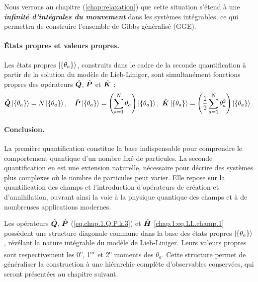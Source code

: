 \begin{mdframed}[
	linewidth=0.5pt, 
	backgroundcolor=gray!5, 
	roundcorner=50pt,	
	innerleftmargin=5pt,
    innerrightmargin=5pt,
    innertopmargin=5pt,
    innerbottommargin=2pt,
    leftmargin=2pt,
    rightmargin=2pt
	]
	Nous verrons au chapitre (\ref{chap:relaxation}) que cette situation s’étend à une {\bf \em infinité d’intégrales du mouvement} dans les systèmes intégrables, ce qui permettra de construire l’ensemble de Gibbs généralisé (GGE).
\end{mdframed}

\paragraph{États propres et valeurs propres.}
Les états propres $\ket{\{\theta_a\}}$, construits dans le cadre de la seconde quantification à partir de la solution du modèle de Lieb-Liniger, sont simultanément fonctions propres des opérateurs $\hat{\bm{Q}}$, $\hat{\bm{P}}$ et $\hat{\bm{K}}$ :
\begin{eqnarray}\label{chap1:eq.Q.P.K.theta.1}
\hat{\bm{Q}} \ket{\{\theta_a\}} = N \ket{\{\theta_a\}}, \quad
\hat{\bm{P}} \ket{\{\theta_a\}} = \left( \sum_{a=1}^N \theta_a \right) \ket{\{\theta_a\}}, \
\hat{\bm{K}} \ket{\{\theta_a\}} = \left( \frac{1}{2} \sum_{a=1}^N \theta_a^2 \right) \ket{\{\theta_a\}}.
\end{eqnarray}

\paragraph*{Conclusion.}

La première quantification constitue la base indispensable pour comprendre le comportement quantique d’un nombre fixé de particules. La seconde quantification en est une extension naturelle, nécessaire pour décrire des systèmes plus complexes où le nombre de particules peut varier. Elle repose sur la quantification des champs et l’introduction d’opérateurs de création et d’annihilation, ouvrant ainsi la voie à la physique quantique des champs et à de nombreuses applications modernes.

\medskip

Les opérateurs $\hat{\bm{Q}}$, $\hat{\bm{P}}$ (\eqref{eq.chap.1.Q.P.k.3}) et $\hat{\bm{H}}$ \eqref{chap.1:eq.LL.champ.1} possèdent une structure diagonale commune dans la base des états propres $\ket{\{\theta_a\}}$, révélant la nature intégrable du modèle de Lieb-Liniger. Leurs valeurs propres sont respectivement les 0\textsuperscript{e}, 1\textsuperscript{er} et 2\textsuperscript{e} moments des $\theta_a$. Cette structure permet de généraliser la construction à une hiérarchie complète d’observables conservées, qui seront présentées au chapitre suivant.

